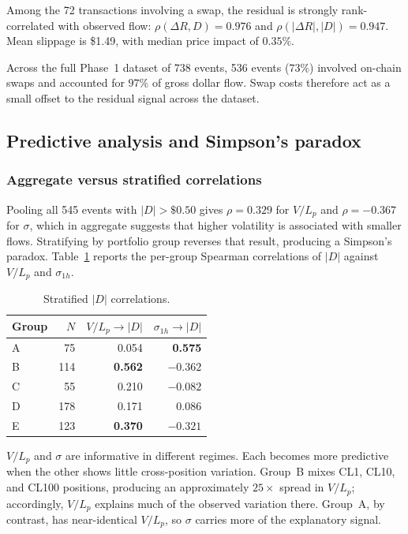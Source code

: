 \documentclass[11pt,a4paper]{article}
\theoremstyle{plain}
\begin{document}
Among the 72 transactions involving a swap, the residual is strongly rank-correlated with observed flow: $\rho(\Delta R, D) = 0.976$ and $\rho(|\Delta R|, |D|) = 0.947$. Mean slippage is \$1.49, with median price impact of $0.35\%$.

Across the full Phase~1 dataset of 738 events, 536 events ($73\%$) involved on-chain swaps and accounted for $97\%$ of gross dollar flow. Swap costs therefore act as a small offset to the residual signal across the dataset.

\subsection{Predictive analysis and Simpson's paradox}\label{sec:predictive}

\subsubsection{Aggregate versus stratified correlations}

Pooling all 545 events with $|D| > \$0.50$ gives $\rho = 0.329$ for $V/L_p$ and $\rho = -0.367$ for $\sigma$, which in aggregate suggests that higher volatility is associated with smaller flows. Stratifying by portfolio group reverses that result, producing a Simpson's paradox. Table~\ref{tab:stratified-correlations} reports the per-group Spearman correlations of $|D|$ against $V/L_p$ and $\sigma_{1h}$.

\begin{table}[H]
\centering
\vspace{-10pt}\caption{Stratified $|D|$ correlations.}
\label{tab:stratified-correlations}
\begin{tabular}{@{}lrrr@{}}
\toprule
Group & $N$ & $V/L_p \to |D|$ & $\sigma_{1h} \to |D|$ \\
\midrule
A & 75  & 0.054           & \textbf{0.575} \\
B & 114 & \textbf{0.562}  & $-0.362$ \\
C & 55  & 0.210           & $-0.082$ \\
D & 178 & 0.171           & $0.086$ \\
E & 123 & \textbf{0.370}  & $-0.321$ \\
\bottomrule
\end{tabular}
\end{table}

$V/L_p$ and $\sigma$ are informative in different regimes. Each becomes more predictive when the other shows little cross-position variation. Group~B mixes CL1, CL10, and CL100 positions, producing an approximately $25\times$ spread in $V/L_p$; accordingly, $V/L_p$ explains much of the observed variation there. Group~A, by contrast, has near-identical $V/L_p$, so $\sigma$ carries more of the explanatory signal.
\end{document}
